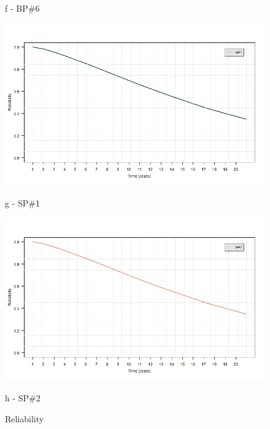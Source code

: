 \begin{figure}[!htb]
\begin{minipage}[b]{0.5\linewidth}
		\caption*{f - BP\#6}
	\end{minipage}
	\hspace{0.05cm}
	\begin{minipage}[b]{0.5\linewidth}
		\centering
		\includegraphics[width=\textwidth]{figures/ch05_fig_sur_pump7}
		\caption*{g -  SP\#1}
	\end{minipage}
	\hspace{0.05cm}
	\begin{minipage}[b]{0.5\linewidth}
		\centering
		\includegraphics[width=\textwidth]{figures/ch05_fig_sur_pump8}
		\caption*{h - SP\#2}
	\end{minipage}
	\caption{Reliability}
	\label{ch05_fig_reliability}
\end{figure}

